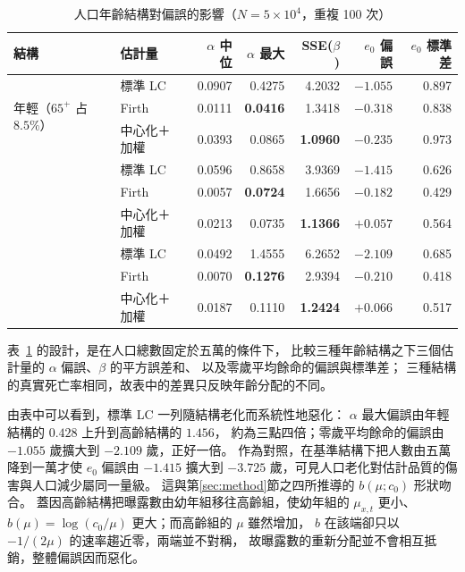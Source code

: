 \documentclass[UTF8, fontset=macnew, a4paper, 12pt]{ctexart}
\begin{document}
\begin{table}[H]
\centering
\caption{人口年齡結構對偏誤的影響（$N=5\times10^4$，重複 100 次）}
\small
\renewcommand{\arraystretch}{1.15}
\begin{tabular}{llrrrrr}
\toprule
結構 & 估計量 & $\alpha$ 中位 & $\alpha$ 最大 & SSE($\beta$) & $e_0$ 偏誤 & $e_0$ 標準差\\
\midrule
\multirow{3}{*}{年輕（$65^{+}$ 占 $8.5\%$）}
 & 標準 LC      & 0.0907 & 0.4275 & 4.2032 & $-1.055$ & 0.897\\
 & Firth        & 0.0111 & \textbf{0.0416} & 1.3418 & $-0.318$ & 0.838\\
 & 中心化＋加權 & 0.0393 & 0.0865 & \textbf{1.0960} & \textbf{$-0.235$} & 0.973\\
\addlinespace
\multirow{3}{*}{基準（$20.3\%$）}
 & 標準 LC      & 0.0596 & 0.8658 & 3.9369 & $-1.415$ & 0.626\\
 & Firth        & 0.0057 & \textbf{0.0724} & 1.6656 & $-0.182$ & 0.429\\
 & 中心化＋加權 & 0.0213 & 0.0735 & \textbf{1.1366} & \textbf{$+0.057$} & 0.564\\
\addlinespace
\multirow{3}{*}{高齡（$31.7\%$）}
 & 標準 LC      & 0.0492 & 1.4555 & 6.2652 & $-2.109$ & 0.685\\
 & Firth        & 0.0070 & \textbf{0.1276} & 2.9394 & $-0.210$ & 0.418\\
 & 中心化＋加權 & 0.0187 & 0.1110 & \textbf{1.2424} & \textbf{$+0.066$} & 0.517\\
\bottomrule
\end{tabular}
\label{tab:popstr}
\end{table}

表~\ref{tab:popstr} 的設計，是在人口總數固定於五萬的條件下，
比較三種年齡結構之下三個估計量的 $\alpha$ 偏誤、$\beta$ 的平方誤差和、
以及零歲平均餘命的偏誤與標準差；
三種結構的真實死亡率相同，故表中的差異只反映年齡分配的不同。

由表中可以看到，標準 LC 一列隨結構老化而系統性地惡化：
$\alpha$ 最大偏誤由年輕結構的 $0.428$ 上升到高齡結構的 $1.456$，
約為三點四倍；零歲平均餘命的偏誤由 $-1.055$ 歲擴大到 $-2.109$ 歲，正好一倍。
作為對照，在基準結構下把人數由五萬降到一萬才使 $e_0$ 偏誤由 $-1.415$
擴大到 $-3.725$ 歲，可見人口老化對估計品質的傷害與人口減少屬同一量級。
這與第\ref{sec:method}節之四所推導的 $b(\mu;c_0)$ 形狀吻合。
蓋因高齡結構把曝露數由幼年組移往高齡組，使幼年組的 $\mu_{x,t}$ 更小、
$b(\mu)=\log(c_0/\mu)$ 更大；而高齡組的 $\mu$ 雖然增加，
$b$ 在該端卻只以 $-1/(2\mu)$ 的速率趨近零，兩端並不對稱，
故曝露數的重新分配並不會相互抵銷，整體偏誤因而惡化。
\end{document}
